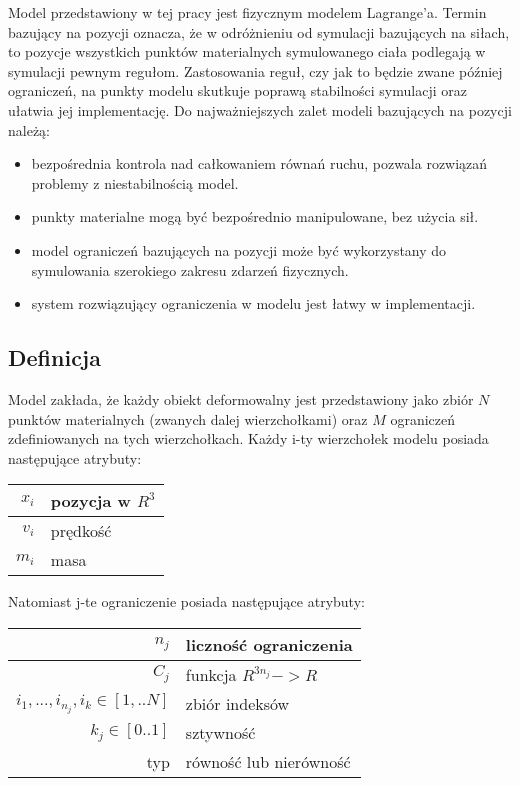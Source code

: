 Model przedstawiony w tej pracy jest fizycznym modelem Lagrange'a. Termin
bazujący na pozycji oznacza, że w odróżnieniu od symulacji bazujących na siłach, to pozycje
wszystkich punktów materialnych symulowanego ciała podlegają w symulacji pewnym
regułom. Zastosowania reguł, czy jak to będzie zwane później ograniczeń, na
punkty modelu skutkuje poprawą stabilności symulacji oraz ułatwia jej
implementację. Do najważniejszych zalet modeli bazujących na pozycji należą:
\begin{itemize}
	\item bezpośrednia kontrola nad całkowaniem równań ruchu, pozwala rozwiązań
	problemy z niestabilnością model.
	\item punkty materialne mogą być bezpośrednio manipulowane, bez użycia sił.
	\item model ograniczeń bazujących na pozycji może być wykorzystany do
	symulowania szerokiego zakresu zdarzeń fizycznych.
	\item system rozwiązujący ograniczenia w modelu jest łatwy w implementacji.
\end{itemize}

\subsection{Definicja}
Model zakłada, że każdy obiekt deformowalny jest przedstawiony jako zbiór $N$
punktów materialnych (zwanych dalej wierzchołkami) oraz $M$ ograniczeń
zdefiniowanych na tych wierzchołkach. Każdy i-ty wierzchołek modelu posiada
następujące atrybuty:

\centering
\begin{tabular}{|r|l|}
\hline
$x_i$ & pozycja w $R^3$ \\
\hline
$v_i$ & prędkość \\
\hline
$m_i$ & masa\\
\hline
\end{tabular}

\raggedright
Natomiast j-te ograniczenie posiada następujące atrybuty:

\centering
\begin{tabular}{|r|l|}
\hline
$n_j$ & liczność ograniczenia \\
\hline
$C_j$ & funkcja $R^{3n_j} -> R$\\
\hline
${i_1, ..., i_{n_j}}, i_k \in [1,..N]$ & zbiór indeksów\\
\hline
$k_j \in [0.. 1]$ & sztywność\\
\hline
typ & równość lub nierówność\\
\hline
\end{tabular}

